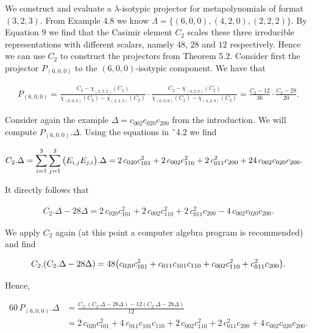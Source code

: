 We construct and evaluate a $\lambda$-isotypic projector for metapolynomials of format $(3,2,3)$.
From Example 4.8 we know $\Lambda=\{(6,0,0),(4,2,0),(2,2,2)\}$.
By Equation 9 we find that the Casimir element $C_{2}$ scales these three irreducible representations with different scalars, namely $48$, $28$ and $12$ respectively.
Hence we can use $C_{2}$ to construct the projectors from Theorem 5.2.
Consider first the projector $P_{(6,0,0)}$ to the $(6,0,0)$-isotypic component.
We have that



\[\begin{aligned}
\displaystyle P_{(6,0,0)}=\frac{C_{2}-\chi_{(2,2,2)}(C_{2})}{\chi_{(6,0,0)}(C_{2})-\chi_{(2,2,2)}(C_{2})}\cdot\frac{C_{2}-\chi_{(4,2,0)}(C_{2})}{\chi_{(6,0,0)}(C_{2})-\chi_{(4,2,0)}(C_{2})}=\frac{C_{2}-12}{36}\cdot\frac{C_{2}-28}{20}.
\end{aligned}\]


Consider again the example $\Delta=c_{002}c_{020}c_{200}$ from the introduction.
We will compute $P_{(6,0,0)}.\Delta$. Using the equations in ˜4.2 we find



\[\begin{aligned}
\displaystyle C_{2}.\Delta & \displaystyle=\sum_{i=1}^{3}\sum_{j=1}^{3}\big{(}E_{i,j}E_{j,i}\big{)}.\Delta=2\,c_{020}c_{101}^{2}+2\,c_{002}c_{110}^{2}+2\,c_{011}^{2}c_{200}+24\,c_{002}c_{020}c_{200}.
\end{aligned}\]


It directly follows that



\[\begin{aligned}
\displaystyle C_{2}.\Delta-28\Delta=2\,c_{020}c_{101}^{2}+2\,c_{002}c_{110}^{2}+2\,c_{011}^{2}c_{200}-4\,c_{002}c_{020}c_{200}.
\end{aligned}\]


We apply $C_{2}$ again (at this point a computer algebra program is recommended) and find



\[\begin{aligned}
\displaystyle C_{2}.(C_{2}.\Delta-28\Delta)=48\big{(}c_{020}c_{101}^{2}+c_{011}c_{101}c_{110}+c_{002}c_{110}^{2}+c_{011}^{2}c_{200}\big{)}.
\end{aligned}\]


Hence,



\[\begin{aligned}
\displaystyle 60\,P_{(6,0,0)}.\Delta & \displaystyle=\frac{C_{2}.(C_{2}.\Delta-28\Delta)-12(C_{2}.\Delta-28\Delta)}{12} \\
 & \displaystyle=2\,c_{020}c_{101}^{2}+4\,c_{011}c_{101}c_{110}+2\,c_{002}c_{110}^{2}+2\,c_{011}^{2}c_{200}+4\,c_{002}c_{020}c_{200}.
\end{aligned}\]


